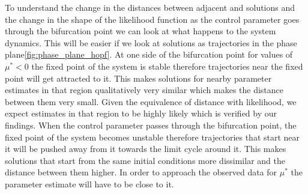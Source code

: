 To understand the change in the distances between adjacent and solutions and the change in the shape of the likelihood function as the control parameter goes through the bifurcation point we can look at what happens to the system dynamics. This will be easier if we look at solutions as trajectories in the phase plane\ref{fig:phase_plane_hopf}. At one side of the bifurcation point for values of $\mu^* < 0$ the fixed point of the system is stable therefore trajectories near the fixed point will get attracted to it. This makes solutions for nearby parameter estimates in that region qualitatively very similar which makes the distance between them very small. Given the equivalence of distance with likelihood, we expect estimates in that region to be highly likely which is verified by our findings. When the control parameter passes through the bifurcation point, the fixed point of the system becomes unstable therefore trajectories that start near it will be pushed away from it towards the limit cycle around it. This makes solutions that start from the same initial conditions more dissimilar and the distance between them higher. In order to approach the observed data for $\mu^*$ the parameter estimate will have to be close to it.
